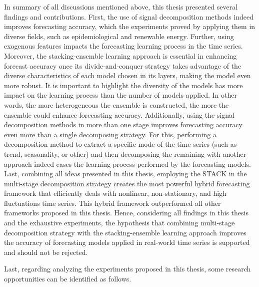In summary of all discussions mentioned above, this thesis presented several findings and contributions. First, the use of signal decomposition methods indeed improves forecasting accuracy, which the experiments proved by applying them in diverse fields, such as epidemiological and renewable energy. Further, using exogenous features impacts the forecasting learning process in the time series. Moreover, the stacking-ensemble learning approach is essential in enhancing forecast accuracy once its divide-and-conquer strategy takes advantage of the diverse characteristics of each model chosen in its layers, making the model even more robust. It is important to highlight the diversity of the models has more impact on the learning process than the number of models applied. In other words, the more heterogeneous the ensemble is constructed, the more the ensemble could enhance forecasting accuracy. Additionally, using the signal decomposition methods in more than one stage improves forecasting accuracy even more than a single decomposing strategy. For this, performing a decomposition method to extract a specific mode of the time series (such as trend, seasonality, or other) and then decomposing the remaining with another approach indeed eases the learning process performed by the forecasting models. Last, combining all ideas presented in this thesis, employing the \ac{STACK} in the multi-stage decomposition strategy creates the most powerful hybrid forecasting framework that efficiently deals with nonlinear, non-stationary, and high fluctuations time series. This hybrid framework outperformed all other frameworks proposed in this thesis. Hence, considering all findings in this thesis and the exhaustive experiments, the hypothesis that combining multi-stage decomposition strategy with the stacking-ensemble learning approach improves the accuracy of forecasting models applied in real-world time series is supported and should not be rejected.

Last, regarding analyzing the experiments proposed in this thesis, some research opportunities can be identified as follows.

